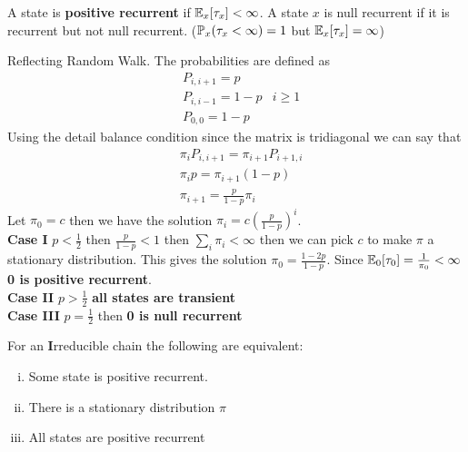 \documentclass[12pt,a4paper]{article}
\begin{document}
\begin{defn}
    $\;$\\
    A state is \textbf{positive recurrent} if $\E_x[\tau_x] < \infty$. A state $x$ is null recurrent if it is recurrent but not null recurrent. ($\P_x(\tau_x < \infty) = 1$ but $\E_x[\tau_x] = \infty$)
\end{defn}
\begin{example}
    Reflecting Random Walk. The probabilities are defined as 
    \begin{align*}
        &P_{i, i+1} = p\\
        &P_{i, i-1} = 1 - p & i \geq 1\\
        &P_{0,0} = 1-p
    \end{align*}
    Using the detail balance condition since the matrix is tridiagonal we can say that
    \begin{align*}
        &\pi_iP_{i, i+1} = \pi_{i+1}P_{i+1,i}\\
        &\pi_ip = \pi_{i+1}(1-p)\\
        &\pi_{i+1} = \frac{p}{1-p}\pi_i
    \end{align*}
    Let $\pi_0 = c$ then we have the solution $\pi_i =c\left( \frac{p}{1-p}\right)^i$. \\
    \textbf{Case I} $p < \frac{1}{2}$ then $\frac{p}{1-p} < 1$ then $\sum_i \pi_i < \infty$ then we can pick $c$ to make $\pi$ a stationary distribution.  This gives the solution $\pi_0 = \frac{1-2p}{1-p}$. Since $\E_0[\tau_0] = \frac{1}{\pi_0} < \infty$ \textbf{0 is positive recurrent}. \\
    \textbf{Case II} $p > \frac{1}{2}$ \textbf{all states are transient}\\
    \textbf{Case III} $p = \frac{1}{2}$ then \textbf{0 is null recurrent} 
\end{example}
\begin{thm}
    For an \textbf{I}rreducible chain the following are equivalent:
    \begin{enumerate}[(i)]
        \item  Some state is positive recurrent.
        \item  There is a stationary distribution $\pi$
        \item  All states are positive recurrent
    \end{enumerate}
\end{thm}
\newpage
\end{document}
